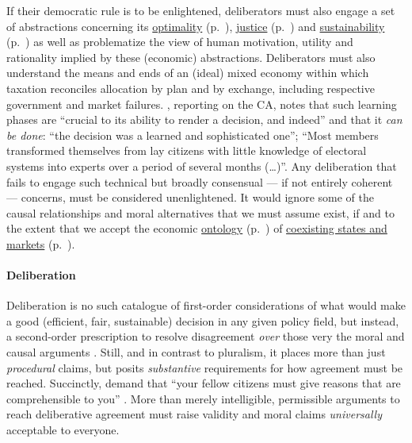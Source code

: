 If their democratic rule is to be enlightened, deliberators must also engage a set of abstractions concerning its \hyperref[sec:tax-optimality]{optimality} (p.~\pageref{sec:tax-optimality}), \hyperref[sec:tax-justice]{justice} (p.~\pageref{sec:tax-justice}) and \hyperref[sec:tax-sustainability]{sustainability} (p.~\pageref{sec:tax-sustainability}) as well as problematize the view of human motivation, utility and rationality implied by these (economic) abstractions.
Deliberators must also understand the means and ends of an (ideal) mixed economy within which taxation reconciles allocation by plan and by exchange, including respective government and market failures.
\cite[K1513]{Warren2008}, reporting on the \gls{CA}, notes that such learning phases are ``crucial to its ability to  render a decision, and indeed'' and that it \emph{can be done}: ``the decision was a learned and sophisticated one''; 
``Most members transformed themselves from lay citizens with little knowledge of electoral systems into experts over a period of several months (\ldots)''.
Any deliberation that fails to engage such technical but broadly consensual --- if not entirely coherent --- concerns, must be considered unenlightened. 
It would ignore some of the causal relationships and moral alternatives that we must assume exist, if and to the extent that we accept the economic \hyperref[sec:ontology]{ontology} (p.~\pageref{sec:ontology}) of \hyperref[chap:mixed-economy]{coexisting states and markets} (p.~\pageref{chap:mixed-economy}).

\paragraph{Deliberation}
Deliberation is no such catalogue of first-order considerations of what would make a good (efficient, fair, sustainable) decision in any given policy field, but instead, a second-order prescription to resolve disagreement \emph{over} those very the moral and causal arguments \citep[125]{GutmannThompson-2004-aa}.
Still, and in contrast to pluralism, it places more than just \emph{procedural} claims, but posits \emph{substantive} requirements for how agreement must be reached.
Succinctly, \citeauthor{GutmannThompson-2004-aa} demand that ``your fellow citizens must give reasons that are comprehensible to you'' \citeyearpar[K177]{GutmannThompson-2004-aa}.
More than merely intelligible, permissible arguments to reach deliberative agreement must raise validity \citep{Habermas1984} and moral \citep{Rawls-1971} claims \emph{universally} acceptable to everyone.

